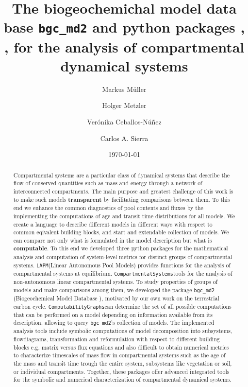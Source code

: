 \documentclass[a4paper]{article}
\title{The biogeochemichal model data base \texttt{bgc\_md2} and python
packages  \LAPM, \CompartmentalSystems, \ComputabilityGraphs for the analysis of compartmental dynamical systems}
\date{\today}
\author[1]{M{arkus M{\"{u}}ller}}
\author[1]{Holger Metzler}
\author[1]{Ver{\'{o}}nika Ceballos-N{\'{u}}{\~{n}}ez}
\author[1]{Carlos A. Sierra}
\affil[1]{Max Planck Institute for Biogeochemistry, Hans-Knöll-Str. 10, 07745 Jena, Germany}
\newcommand{\LAPM}{\texttt{LAPM}}
\newcommand{\CompartmentalSystems}{\texttt{CompartmentalSystems}}
\newcommand{\ComputabilityGraphs}{\texttt{ComputabilityGraphs}}
\begin{document}
\maketitle

\begin{abstract} \noindent
Compartmental systems are a particular class of dynamical systems that describe
  the flow of conserved quantities such as mass and energy through a network of
  interconnected compartments. 
  The main purpose and greatest challenge of this work is to make such models
  {\bf transparent} by  facilitating  comparisons between them.
  To this end we enhance the common diagnostics of pool contents and fluxes by the
  implementing the computations of age and
  transit time distributions for all models.
  We create a language to describe different models in different ways with
  respect to common eqivalent building blocks, and start and extendable
  collection of models.
  We can compare not only what is formulated in the model description but what is 
  {\bf computable}. 
  To this end we  developed three python packages for the
  mathematical analysis and computation of system-level metrics for distinct
  groups of compartmental systems. 
  \LAPM (Linear Autonomous Pool Models)
  provides functions for the analysis of compartmental systems at
  equilibrium. 
  \CompartmentalSystems tools for the
  analysis of non-autonomous linear compartmental systems. 
  To study properties of groups of models and make comparisons among them, we developed
  the package \texttt{bgc\_md2} (Biogeochemical Model Database ), motivated by our own work
  on the terrestrial carbon cycle.
  \ComputabilityGraphs can determine the set of all possible computations that
  can be performed on a model depending on information available from its
  description, allowing to query \texttt{bgc\_md2}'s collection of models.
  The implemented analysis tools include symbolic computations  
  of model decomposition into subsystems, flowdiagrams, transformation and reformulation with respect to
  different building blocks e.g. matrix versus flux equations and also 
  difficult to obtain numerical metrics to characterize timescales
  of mass flow in compartmental systems such as the age of the mass and transit time
  trough the entire system, subsystems like vegetation or soil, or individual
  compartments.
  Together, these packages offer advanced integrated 
  tools for the symbolic and numerical characterization of
  compartmental dynamical systems.
\end{abstract}
\end{document}
